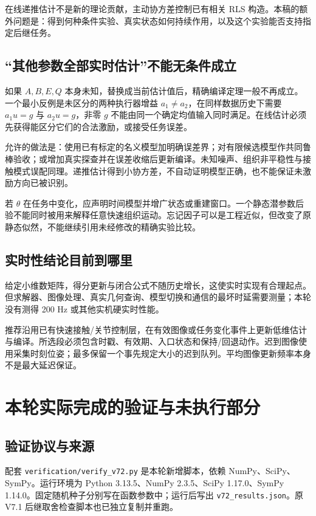 \documentclass[UTF8,fontset=fandol,11pt,a4paper]{ctexart}
\theoremstyle{definition}\newtheorem{definition}[theorem]{定义}\newtheorem{assumption}[theorem]{条件}
\numberwithin{equation}{section}
\begin{document}
在线递推估计不是新的理论贡献，主动协方差控制已有相关 RLS 构造\cite{dual}。本稿的额外问题是：得到何种条件实验、真实状态如何持续作用，以及这个实验能否支持指定后继任务。

\subsection{“其他参数全部实时估计”不能无条件成立}
如果 $A,B,E,Q$ 本身未知，替换成当前估计值后，精确编译定理一般不再成立。一个最小反例是未区分的两种执行器增益 $a_1\ne a_2$，在同样数据历史下需要 $a_1u=g$ 与 $a_2u=g$，非零 $g$ 不能由同一个确定均值输入同时满足。在线估计必须先获得能区分它们的合法激励，或接受任务误差。

允许的做法是：使用已有标定的名义模型加明确误差界；对有限候选模型作共同鲁棒验收；或增加真实探查并在误差收缩后更新编译。未知噪声、组织非平稳性与接触模式误配同理。递推估计得到小协方差，不自动证明模型正确，也不能保证未激励方向已被识别。

若 $\theta$ 在任务中变化，应声明时间模型并增广状态或重建窗口。一个静态潜参数后验不能同时被用来解释任意快速组织运动。忘记因子可以是工程近似，但改变了原静态似然，不能继续引用未经修改的精确实验比较。

\subsection{实时性结论目前到哪里}
给定小维数矩阵，得分更新与闭合公式不随历史增长，这使实时实现有合理起点。但求解器、图像处理、真实几何查询、模型切换和通信的最坏时延需要测量；本轮没有测得 200 Hz 或其他实机硬实时性能。

推荐沿用已有快速接触/关节控制层，在有效图像或任务变化事件上更新低维估计与编译。所选段必须包含时戳、有效期、入口状态和保持/回退动作。迟到图像使用采集时刻位姿；最多保留一个事先规定大小的迟到队列。平均图像更新频率本身不是最大延迟保证。

\section{本轮实际完成的验证与未执行部分}
\label{sec:validation}
\subsection{验证协议与来源}
配套 \texttt{verification/verify\_v72.py} 是本轮新增脚本，依赖 NumPy、SciPy、SymPy。运行环境为 Python 3.13.5、NumPy 2.3.5、SciPy 1.17.0、SymPy 1.14.0。固定随机种子分别写在函数参数中；运行后写出 \texttt{v72\_results.json}。原 V7.1 后继取舍检查脚本也已独立复制并重跑。
\end{document}
